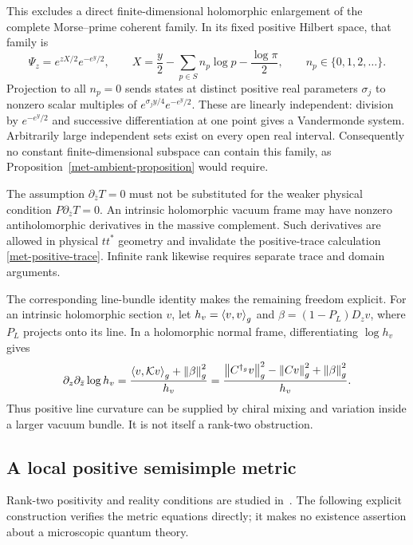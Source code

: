 This excludes a direct finite-dimensional holomorphic enlargement of the
complete Morse--prime coherent family.  In its fixed positive Hilbert space,
that family is
\begin{equation}
 \Psi_z=e^{zX/2}e^{-e^y/2},\qquad
 X=\frac y2-\sum_{p\in S}n_p\log p-\frac{\log\pi}{2},
 \qquad n_p\in\{0,1,2,\ldots\}.
 \label{met-coherent-family}
\end{equation}
Projection to all $n_p=0$ sends states at distinct positive real parameters
$\sigma_j$ to nonzero scalar multiples of
$e^{\sigma_jy/4}e^{-e^y/2}$.  These are linearly independent: division by
$e^{-e^y/2}$ and successive differentiation at one point gives a Vandermonde
system.  Arbitrarily large independent sets exist on every open real
interval.  Consequently no constant finite-dimensional subspace can contain
this family, as Proposition~\ref{met-ambient-proposition} would require.

The assumption $\partial_{\bar z}T=0$ must not be substituted for the weaker
physical condition $P\partial_{\bar z}T=0$.  An intrinsic holomorphic vacuum
frame may have nonzero antiholomorphic derivatives in the massive complement.
Such derivatives are allowed in physical $tt^*$ geometry and invalidate the
positive-trace calculation \eqref{met-positive-trace}.  Infinite rank likewise
requires separate trace and domain arguments.

The corresponding line-bundle identity makes the remaining freedom explicit.
For an intrinsic holomorphic section $v$, let
$h_v=\left\langle v,v\right\rangle_g$ and $\beta=(1-P_L)D_zv$, where $P_L$ projects onto its line.
In a holomorphic normal frame, differentiating $\log h_v$ gives
\begin{equation}
 \partial_z\partial_{\bar z}\log h_v
 =\frac{\left\langle v,\mathcal Kv\right\rangle_g+\left\lVert\beta\right\rVert_g^2}{h_v}
 =\frac{\left\lVert C^{\dagger_g}v\right\rVert_g^2-\left\lVert Cv\right\rVert_g^2
                  +\left\lVert\beta\right\rVert_g^2}{h_v}.
 \label{met-gauss-line}
\end{equation}
Thus positive line curvature can be supplied by chiral mixing and variation
inside a larger vacuum bundle.  It is not itself a rank-two obstruction.

\subsection{A local positive semisimple metric}
\label{met-semisimple}

Rank-two positivity and reality conditions are studied in~\cite{Takahashi}.
The following explicit construction verifies the metric equations directly;
it makes no existence assertion about a microscopic quantum theory.

